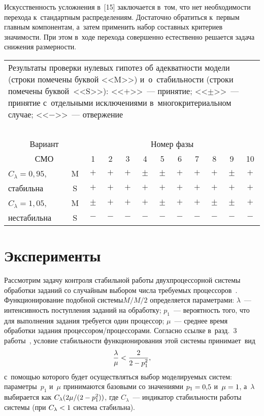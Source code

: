 \begin{multicols}{2}
     Искусственность усложнения в~[15] заключается в~том, что нет 
необходимости перехода к~стандартным распределениям. Достаточно обратиться к~первым главным компонентам, а~затем применить набор со\-став\-ных критериев 
значимости. При этом в~ходе перехода совершенно естественно решается задача 
снижения раз\-мер\-ности. 

\begin{table*}\small
\begin{center}
\begin{tabular}{|l|c|c|c|c|c|c|c|c|c|c|c|}
\multicolumn{12}{p{100mm}}{Результаты проверки нулевых гипотез об адекватности модели (строки 
помечены бук\-вой <<M>>) и~о~ста\-биль\-ности (строки помечены бук\-вой~<<S>>): <<$+$>>~--- 
принятие; <<$\pm$>>~--- принятие с~отдельными исключениями в~многокритериальном 
случае;  <<$-$>>~--- отвер\-же\-ние}\\
\multicolumn{12}{c}{\ }\\[-6pt]
\hline
\multicolumn{2}{|c|}{Вариант}&\multicolumn{10}{c|}{Номер фазы}\\
\cline{3-12}
\multicolumn{2}{|c|}{СМО}&1&2&3&4&5&6&7&8&9&10\\
\hline
$C_\lambda=0{,}95$,
&M&$+$&$+$&$+$&$\pm$&$\pm$&$+$&$+$&$+$&$\pm$&$+$\\
стабильна&S&$+$&$+$&$+$&$+$&$+$&$+$&$+$&$+$&$+$&$+$\\
\hline
$C_\lambda=1{,}05$,
&M&$\pm$&$+$&$+$&$+$&$\pm$&$+$&$+$&$\pm$&$\pm$&$+$\\
нестабильна&S&$-$&$-$&$-$&$-$&$-$&$-$&$-$&$-$&$-$&$-$\\
\hline
\end{tabular}
\end{center}
\end{table*}

\section{Эксперименты}

     
     Рассмотрим задачу контроля стабильной работы двухпроцессорной системы 
обработки заданий со случайным выбором числа требуемых  
процессоров~\cite{2-kri}. Функционирование подобной сис\-те\-мы\linebreak $M/M/2$ 
определяется параметрами: $\lambda$~--- интенсивность поступления заданий на 
обработку; $p_1$~--- вероятность того, что для выполнения задания \mbox{требуется} 
один процессор; $\mu$~--- среднее время обработки задания  
про\-цес\-со\-ром/про\-цес\-со\-ра\-ми. \mbox{Согласно} ссылке в~разд.~3 работы~\cite{2-kri}, 
условие ста\-биль\-ности функционирования этой сис\-те\-мы при\-ни\-ма\-ет~вид 
     $$
     \displaystyle\frac{\displaystyle \lambda\mathstrut}{\displaystyle \mu\mathstrut}< \displaystyle\frac{\displaystyle 2\mathstrut}{\displaystyle 2- p_1^2\mathstrut},
     $$
      с~по\-мощью которого будет 
осуществляться выбор моделируемых сис\-тем: па\-ра\-мет\-ры~$p_1$ и~$\mu$ 
принимаются базовыми со значениями $p_1\hm= 0{,}5$ и~$\mu\hm= 1$,\linebreak 
а~$\lambda$ выбирается как $C_\lambda(2\mu/(2\hm- p_1^2))$, где $C_\lambda$~--- 
индикатор стабильности работы сис\-те\-мы (при $C_\lambda\hm<1$ сис\-те\-ма 
стабильна). 
     

\end{multicols}
